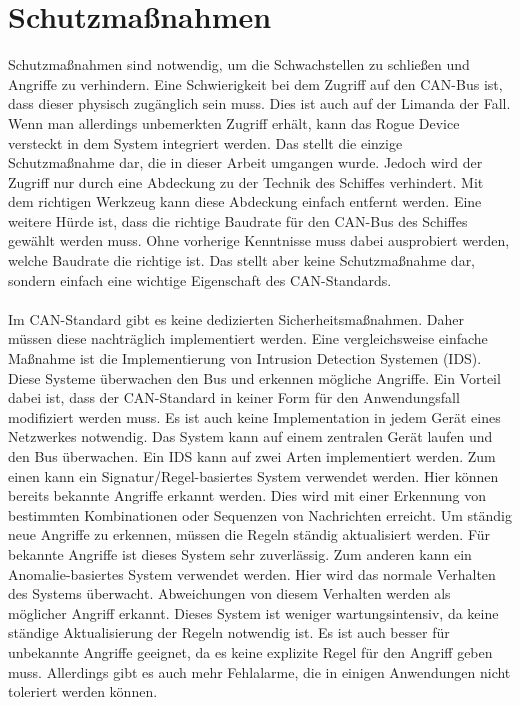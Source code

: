 \section{Schutzmaßnahmen}
Schutzmaßnahmen sind notwendig, um die Schwachstellen zu schließen und Angriffe zu verhindern.
Eine Schwierigkeit bei dem Zugriff auf den CAN-Bus ist, dass dieser physisch zugänglich sein muss. Dies ist auch auf der Limanda
der Fall. Wenn man allerdings unbemerkten Zugriff erhält, kann das Rogue Device versteckt in dem System integriert werden. 
Das stellt die einzige Schutzmaßnahme dar, die in dieser Arbeit umgangen wurde. Jedoch wird der Zugriff nur durch eine Abdeckung zu der Technik des Schiffes
verhindert. Mit dem richtigen Werkzeug kann diese Abdeckung einfach entfernt werden.
Eine weitere Hürde ist, dass die richtige Baudrate für den CAN-Bus des Schiffes gewählt werden muss. Ohne vorherige Kenntnisse
muss dabei ausprobiert werden, welche Baudrate die richtige ist. Das stellt aber keine Schutzmaßnahme dar, sondern einfach
eine wichtige Eigenschaft des CAN-Standards.\\
\\
Im CAN-Standard gibt es keine dedizierten Sicherheitsmaßnahmen. Daher müssen diese nachträglich implementiert werden.
Eine vergleichsweise einfache Maßnahme ist die Implementierung von Intrusion Detection Systemen (IDS). Diese Systeme überwachen
den Bus und erkennen mögliche Angriffe. Ein Vorteil dabei ist, dass der CAN-Standard in keiner Form für den 
Anwendungsfall modifiziert werden muss. Es ist auch keine Implementation in jedem Gerät eines Netzwerkes notwendig.
Das System kann auf einem zentralen Gerät laufen und den Bus überwachen. \cite{Gmiden2016} 
Ein IDS kann auf zwei Arten implementiert werden. Zum einen kann ein Signatur/Regel-basiertes System verwendet werden.
Hier können bereits bekannte Angriffe erkannt werden. Dies wird mit einer Erkennung von bestimmten Kombinationen oder Sequenzen
von Nachrichten erreicht. Um ständig neue Angriffe zu erkennen, müssen die Regeln ständig aktualisiert werden.
Für bekannte Angriffe ist dieses System sehr zuverlässig. Zum anderen kann ein Anomalie-basiertes System verwendet werden.
Hier wird das normale Verhalten des Systems überwacht. Abweichungen von diesem Verhalten werden als möglicher Angriff erkannt.
Dieses System ist weniger wartungsintensiv, da keine ständige Aktualisierung der Regeln notwendig ist. Es ist auch besser für
unbekannte Angriffe geeignet, da es keine explizite Regel für den Angriff geben muss. Allerdings gibt es auch mehr Fehlalarme,
die in einigen Anwendungen nicht toleriert werden können. \cite{Hoppe2009} \\
